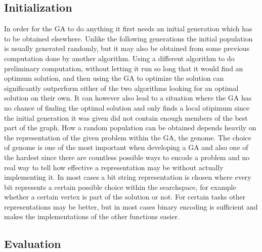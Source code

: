 \subsection{Initialization}
\label{sec:initialization}

In order for the GA to do anything it first needs an initial generation which has to be obtained elsewhere. Unlike the following generations the initial population is usually generated randomly, but it may also be obtained from some previous computation done by another algorithm. Using a different algorithm to do preliminary computation, without letting it run so long that it would find an optimum solution, and then using the GA to optimize the solution can significantly outperform either of the two algorithms looking for an optimal solution on their own. It can however also lead to a situation where the GA has no chance of finding the optimal solution and only finds a local otipimum since the initial generation it was given did not contain enough members of the best part of the graph.
How a random population can be obtained depends heavily on the representation of the given problem within the GA, the genome. The choice of genome is one of the most important when developing a GA and also one of the hardest since there are countless possible ways to encode a problem and no real way to tell how effective a representation may be without actually implementing it. In most cases a bit string representation is chosen where every bit represents a certain possible choice within the searchspace, for example whether a certain vertex is part of the solution or not. For certain tasks other representations may be better, but in most cases binary encoding is sufficient and makes the implementations of the other functions easier.

\subsection{Evaluation}
\label{sec:evaluation}

